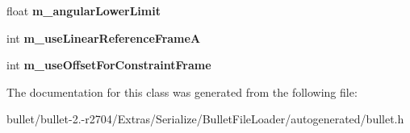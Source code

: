 \begin{DoxyCompactItemize}
\item 
\hypertarget{class_bullet_1_1bt_slider_constraint_data_ae20fa2fdb5166b94bed83c9c29344842}{float {\bfseries m\+\_\+angular\+Lower\+Limit}}\label{class_bullet_1_1bt_slider_constraint_data_ae20fa2fdb5166b94bed83c9c29344842}

\item 
\hypertarget{class_bullet_1_1bt_slider_constraint_data_a6bdc83f41f0173670627b759f24c42d1}{int {\bfseries m\+\_\+use\+Linear\+Reference\+Frame\+A}}\label{class_bullet_1_1bt_slider_constraint_data_a6bdc83f41f0173670627b759f24c42d1}

\item 
\hypertarget{class_bullet_1_1bt_slider_constraint_data_a2d4ce90eed1a36e4d1eec0b677d834e3}{int {\bfseries m\+\_\+use\+Offset\+For\+Constraint\+Frame}}\label{class_bullet_1_1bt_slider_constraint_data_a2d4ce90eed1a36e4d1eec0b677d834e3}

\end{DoxyCompactItemize}


The documentation for this class was generated from the following file\+:\begin{DoxyCompactItemize}
\item 
bullet/bullet-\/2.-\/r2704/\+Extras/\+Serialize/\+Bullet\+File\+Loader/autogenerated/bullet.\+h\end{DoxyCompactItemize}
